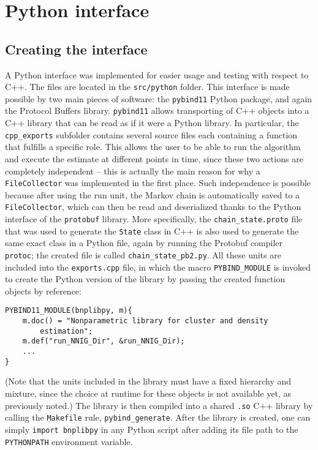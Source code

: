 \chapter{Python interface}

\section{Creating the interface}
A Python interface was implemented for easier usage and testing with respect to C++.
The files are located in the \verb|src/python| folder.
This interface is made possible by two main pieces of software: the \verb|pybind11| Python package, and again the Protocol Buffers library.
\verb|pybind11| allows transporting of C++ objects into a C++ library that can be read as if it were a Python library.
In particular, the \verb|cpp_exports| subfolder contains several source files each containing a function that fulfills a specific role.
This allows the user to be able to run the algorithm and execute the estimate at different points in time, since these two actions are completely independent -- this is actually the main reason for why a \verb|FileCollector| was implemented in the first place.
Such independence is possible because after using the run unit, the Markov chain is automatically saved to a \verb|FileCollector|, which can then be read and deserialized thanks to the Python interface of the \verb|protobuf| library.
More specifically, the \verb|chain_state.proto| file that was used to generate the \verb|State| class in C++ is also used to generate the same exact class in a Python file, again by running the Protobuf compiler \verb|protoc|; the created file is called \verb|chain_state_pb2.py|.
All these units are included into the \verb|exports.cpp| file, in which the macro \verb|PYBIND_MODULE| is invoked to create the Python version of the library by passing the created function objects by reference:
\begin{verbatim}
PYBIND11_MODULE(bnplibpy, m){
    m.doc() = "Nonparametric library for cluster and density
        estimation";
    m.def("run_NNIG_Dir", &run_NNIG_Dir);
    ...
}
\end{verbatim}
(Note that the units included in the library must have a fixed hierarchy and mixture, since the choice at runtime for these objects is not available yet, as previously noted.)
The library is then compiled into a shared \verb|.so| C++ library by calling the \verb|Makefile| rule, \verb|pybind_generate|.
After the library is created, one can simply \verb|import bnplibpy| in any Python script after adding its file path to the \verb|PYTHONPATH| environment variable.

